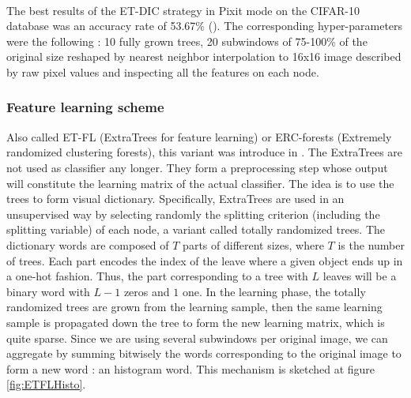 \documentclass[a4paper]{report}
\begin{document}
			\paragraph{}
			The best results of the ET-DIC strategy in Pixit mode on the CIFAR-10 database was an accuracy rate of 53.67\% (\cite{base}). The corresponding hyper-parameters were the following : 10 fully grown trees, 20 subwindows of 75-100\% of the original size reshaped by nearest neighbor interpolation to 16x16 image described by raw pixel values and inspecting all the features on each node.
			
			
			
			\subsubsection{Feature learning scheme}
			Also called ET-FL (ExtraTrees for feature learning) or ERC-forests (Extremely randomized clustering forests), this variant was introduce in \cite{ETFL}. The ExtraTrees are not used as classifier any longer. They form a preprocessing step whose output will constitute the learning matrix of the actual classifier. The idea is to use the trees to form visual dictionary. Specifically, ExtraTrees are used in an unsupervised way by selecting randomly the splitting criterion (including the splitting variable) of each node, a variant called totally randomized trees. The dictionary words are composed of $T$ parts of different sizes, where $T$ is the number of trees. Each part encodes the index of the leave where a given object ends up in a one-hot fashion. Thus, the part corresponding to a tree with $L$ leaves will be a binary word with $L-1$ zeros and $1$ one. In the learning phase, the totally randomized trees are grown from the learning sample, then the same learning sample is propagated down the tree to form the new learning matrix, which is quite sparse. Since we are using several subwindows per original image, we can aggregate by summing bitwisely the words corresponding to the original image to form a new word : an histogram word. This mechanism is sketched at figure \ref{fig:ETFLHisto}.
\end{document}
